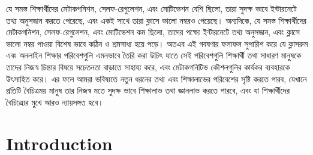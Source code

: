 \documentclass[letterpaper, nobind]{templates/ociamthesis}
\begin{document}
\begin{romanpages}
\begin{spacing}{1.5}
{যে সমস্ত শিক্ষার্থীদের মেটাকগনিশন, সেলফ-রেগুলেশন, এবং মোটিভেশন বেশি ছিলো, তারা সুদক্ষ ভাবে ইন্টারনেটে তথ্য অনুসন্ধান করতে পেরেছে, এবং একই সাথে তারা ক্লাসে ভালো নম্বরও পেয়েছে।
অন্যদিকে, যে সমস্ত শিক্ষার্থীদের মেটাকগনিশন, সেলফ-রেগুলেশন, এবং মোটিভেশন কম ছিলো, তাদের পক্ষ্যে ইন্টারনেটে তথ্য অনুসন্ধান, এবং ক্লাসে ভালো নম্বর পাওয়া বিশেষ ভাবে কঠিন ও শ্রমসাধ্য হয়ে পড়ে।
অতএব এই গবষণার ফলাফল সুপারিশ করে যে ক্লাসরুম এবং অনলাইন শিক্ষার পরিবেশগুলি এমনভাবে তৈরি করা উচিৎ যাতে সেই পরিবেশগুলি শিক্ষার্থী তথা সাধারণ মানুষকে তাদের নিজস্ব চিন্তার বিষয়ে সচেতনতা বাড়াতে সাহায্য করে, এবং মেটাকগনিটিভ কৌশলগুলির কার্যকর ব্যবহারকে উৎসাহিত করে।
এর ফলে আমরা ভবিষ্যতে নতুন ধরনের তথ্য এবং শিক্ষালাভের পরিবেশের সৃষ্টি করতে পারব, যেখানে প্রতিটি বৈচিত্রময় মানুষ তার নিজস্ব মতে সুদক্ষ ভাবে শিক্ষালাভ তথা জ্ঞানলাভ করতে পারবে, এবং যা শিক্ষার্থীদের বৈচিত্র্যের মুখে আরও ন্যায়সঙ্গত হবে।}
\end{spacing}




\dominitoc %

\flushbottom

\tableofcontents

\listoffigures
	\mtcaddchapter


\end{romanpages}

\flushbottom

\hypertarget{introduction}{%
\chapter{Introduction}\label{introduction}}
\end{document}
